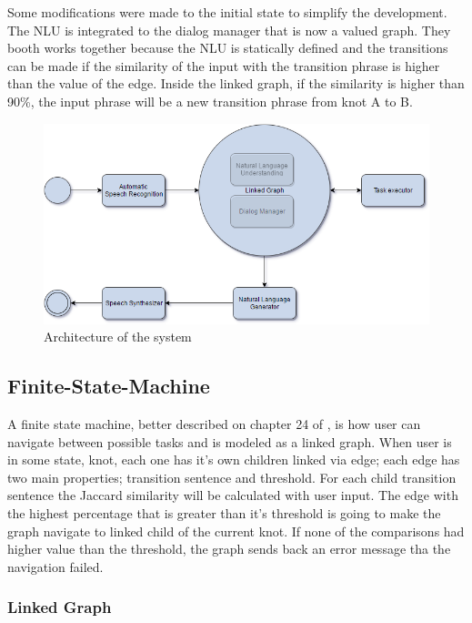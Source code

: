 \documentclass[
	article,			%
	11pt,				%
	oneside,			%
	a4paper,			%
	english,			%
	english,				%
	]{abntex2}
\begin{document}
Some modifications were made to the initial state to simplify the development. The NLU is integrated to
the dialog manager that is now a valued graph. They booth works together because the NLU is statically
defined and the transitions can be made if the similarity of the input with the transition phrase
is higher than the value of the edge. Inside the linked graph, if the similarity is higher than 90\%,
the input phrase will be a new transition phrase from knot A to B.

\begin{figure}[H]
    \caption[english]{Architecture of the system}
    \centering
    \includegraphics[width=\textwidth]{UsedArch}
\end{figure}

\subsection{Finite-State-Machine}

A finite state machine, better described on chapter 24 of \cite{speechlanguageprocessing}, 
is how user can navigate between possible tasks and is modeled as a linked graph. 
When user is in some state, knot, each one has it's own children linked via edge; each edge has two main 
properties; transition sentence and threshold. For each child transition sentence the Jaccard similarity
will be calculated with user input. The edge with the highest percentage that is greater than it's threshold
is going to make the graph navigate to linked child of the current knot. If none of the comparisons had
higher value than the threshold, the graph sends back an error message tha the navigation failed.

\subsubsection{Linked Graph}
\end{document}
